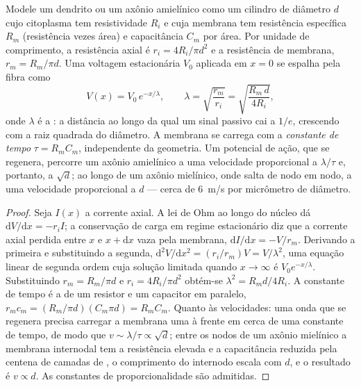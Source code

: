 \begin{theorem}\label{thm:b3:nervous-systems:cable}
Modele um dendrito ou um axônio amielínico como um cilindro de diâmetro
$d$ cujo citoplasma tem resistividade $R_{i}$ e cuja membrana tem
resistência específica $R_{m}$ (resistência vezes área) e capacitância
$C_{m}$ por área. Por unidade de comprimento, a resistência axial é
$r_{i} = 4R_{i}/\pi d^{2}$ e a resistência de membrana, $r_{m} = R_{m}/\pi d$. Uma voltagem estacionária $V_{0}$ aplicada em $x = 0$ se
espalha pela fibra como
\[
V(x) = V_{0}\,e^{-x/\lambda}, \qquad
\lambda = \sqrt{\frac{r_{m}}{r_{i}}} = \sqrt{\frac{R_{m}\,d}{4R_{i}}},
\]
onde $\lambda$ é a \emph{}: a distância ao longo
da qual um sinal passivo cai a $1/e$, crescendo com a raiz quadrada do
diâmetro. A membrana se carrega com a \emph{constante de tempo} $\tau =
R_{m}C_{m}$, independente da geometria. Um potencial de ação, que se
regenera, percorre um axônio amielínico a uma velocidade proporcional a
$\lambda/\tau$ e, portanto, a $\sqrt{d}$; ao longo de um axônio
mielínico, onde salta de nodo em nodo, a uma velocidade proporcional a
$d$ --- cerca de \qty{6}{m/s} por micrômetro de diâmetro.
\end{theorem}
\begin{proof}
Seja $I(x)$ a corrente axial. A lei de Ohm ao longo do núcleo dá
$\mathrm{d}V/\mathrm{d}x = -r_{i}I$; a conservação de carga em regime
estacionário diz que a corrente axial perdida entre $x$ e $x + \mathrm{d}x$ vaza pela membrana, $\mathrm{d}I/\mathrm{d}x = -V/r_{m}$.
Derivando a primeira e substituindo a segunda,
$\mathrm{d}^{2}V/\mathrm{d}x^{2} = (r_{i}/r_{m})V = V/\lambda^{2}$, uma
equação linear de segunda ordem cuja solução limitada quando $x \to \infty$ é $V_{0}e^{-x/\lambda}$. Substituindo $r_{m} = R_{m}/\pi d$ e
$r_{i} =
4R_{i}/\pi d^{2}$ obtém-se $\lambda^{2} = R_{m}d/4R_{i}$. A
constante de tempo é a de um resistor e um capacitor em paralelo,
$r_{m}c_{m} =
(R_{m}/\pi d)(C_{m}\pi d) = R_{m}C_{m}$. Quanto às
velocidades: uma onda que se regenera precisa carregar a membrana uma
 à frente em cerca de uma constante de tempo, de
modo que $v \sim \lambda/\tau \propto \sqrt{d}$; entre os nodos de um
axônio mielínico a membrana internodal tem a resistência elevada e a
capacitância reduzida pela centena de camadas de , o comprimento
do internodo escala com $d$, e o resultado é $v \propto d$. As
constantes de proporcionalidade são admitidas.
\end{proof}

